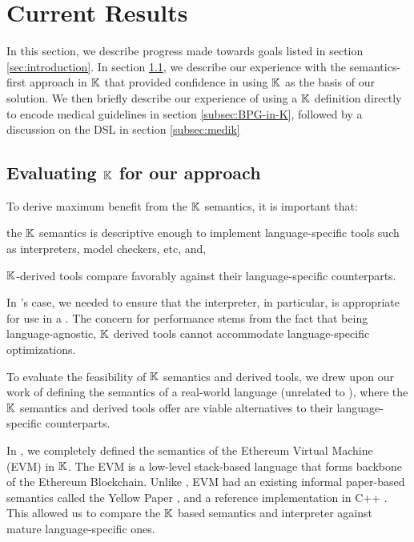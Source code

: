 \section{Current Results}
In this section, we describe progress made towards goals listed
in section \ref{sec:introduction}. In section \ref{subsec:evaluating-k},
we describe our  experience with the semantics-first approach in $\mathbb{K}$ that provided
confidence in using $\mathbb{K}$ as the basis of our solution. We then briefly
describe our experience of using a $\mathbb{K}$ definition directly to encode
medical guidelines in section \ref{subsec:BPG-in-K}, followed by
a discussion on the \MediK{} DSL in section \ref{subsec:medik}


\subsection{Evaluating $\mathbb{K}$ for our approach}\label{subsec:evaluating-k}

To derive maximum benefit from the $\mathbb{K}$ semantics, it is important that:
\begin{enumerate*}[label=(\roman*)]
  \item the $\mathbb{K}$ semantics is descriptive enough to implement language-specific
    tools such as interpreters, model checkers, etc, and,
  \item $\mathbb{K}$-derived tools compare favorably against their language-specific
    counterparts.
\end{enumerate*}
In \MediK{}'s case, we needed to ensure that the interpreter,
in particular, is appropriate for
use in a \CDSS{}. The concern for performance stems from the fact
that being language-agnostic, $\mathbb{K}{}$ derived tools
cannot accommodate language-specific optimizations.

To evaluate the feasibility of $\mathbb{K}$ semantics and derived tools, we
drew upon our work of defining the semantics of a real-world language
(unrelated to \MediK{}), where the $\mathbb{K}$ semantics and derived tools offer
are viable alternatives to their language-specific counterparts.

In \cite{HildenbrandtCSF18},
we completely defined the semantics of the Ethereum Virtual Machine (EVM)
in $\mathbb{K}{}$. The EVM is a low-level stack-based language
that forms backbone of the Ethereum Blockchain. Unlike \MediK{},
EVM had an existing informal paper-based semantics
called the Yellow Paper \cite{evmYellowpaperUrl},
and a reference implementation in C++ \cite{cppEthereumUrl}.
This allowed us to compare the $\mathbb{K}$ based semantics
and interpreter against mature language-specific ones.

